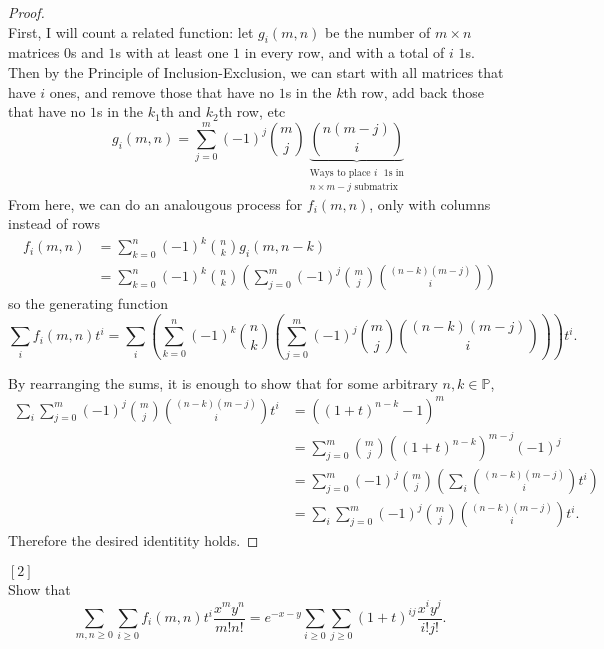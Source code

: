 \documentclass{article}
\newenvironment{problem}[2][Problem]{\begin{trivlist}
\item[\hskip \labelsep {\bfseries #1}\hskip \labelsep {\bfseries #2.}]}{\end{trivlist}}
\begin{document}
\begin{proof} \text{} \\
  First, I will count a related function: let $g_i(m, n)$ be the number of
  $m \times n$ matrices $0$s and $1$s with at least one $1$ in every row, and
  with a total of $i$ $1$s.
  \\
  Then by the Principle of Inclusion-Exclusion, we can start with all matrices
  that have $i$ ones, and remove those that have no $1$s in the $k$th row,
  add back those that have no $1$s in the $k_1$th and $k_2$th row, etc \[
    g_i(m, n) = \sum_{j=0}^m (-1)^j\binom mj
    \underbrace{\binom {n(m-j)}{i}}_{
      \substack{
        \text{Ways to place $i$ $1$s in} \\
        n \times m-j \text{ submatrix}
      }
    }
  \]
  From here, we can do an analougous process for $f_i(m, n)$, only with columns
  instead of rows \begin{align*}
    f_i(m, n)
    &= \sum_{k=0}^n (-1)^k\binom nk g_i(m, n - k) \\
    &= \sum_{k=0}^n (-1)^k\binom nk \left(
      \sum_{j=0}^m (-1)^j\binom mj \binom {(n - k)(m-j)}{i}
    \right)
  \end{align*} so the generating function \[
    \sum_i f_i(m, n) t^i = \sum_i \left(\sum_{k=0}^n (-1)^k\binom nk \left(
      \sum_{j=0}^m (-1)^j\binom mj \binom {(n - k)(m-j)}{i}
    \right)\right) t^i.
  \]

  By rearranging the sums, it is enough to show that for some arbitrary
  $n, k \in \mathbb P$, \begin{align*}
  \sum_i \sum_{j=0}^m (-1)^j\binom mj \binom {(n - k)(m-j)}{i} t^i
    &= ((1 + t)^{n - k} - 1)^m \\
    &= \sum_{j=0}^m \binom mj ((1 + t)^{n - k})^{m-j} (-1)^j \\
    &= \sum_{j=0}^m (-1)^j\binom mj \left(\sum_{i}\binom{(n - k)(m - j)}{i} t^i\right) \\
    &= \sum_i\sum_{j=0}^m (-1)^j\binom mj \binom{(n - k)(m - j)}{i} t^i.
  \end{align*}
  Therefore the desired identitity holds.
\end{proof}
\pagebreak
\begin{problem}{25 (b)} $[2]$ \\
  Show that \[
    \sum_{m, n \geq 0} \sum_{i \geq 0} f_i(m,n)t^i\frac{x^m y^n}{m!n!}
    = e^{-x-y}\sum_{i \geq 0} \sum_{j \geq 0}(1 + t)^{ij}\frac{x^i y^j}{i!j!}.
  \]
\end{problem}
\end{document}

